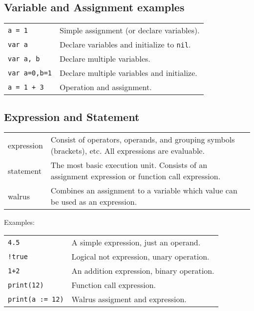 \subsection*{Variable and Assignment examples}
\begin{tabular}{@{}ll}
    \texttt{a = 1} & Simple assignment (or declare variables). \\
    \texttt{var a} & Declare variables and initialize to \texttt{nil}. \\
    \texttt{var a, b} & Declare multiple variables. \\
    \texttt{var a=0,b=1} & Declare multiple variables and initialize. \\
    \texttt{a = 1 + 3} & Operation and assignment. \\
\end{tabular}

\subsection*{Expression and Statement}
\begin{tabular}{@{}lp{}}
    \textsf{expression} & Consist of operators, operands, and grouping symbols (brackets), etc. All expressions are evaluable. \\
    \textsf{statement} & The most basic execution unit. Consists of an assignment expression or function call expression. \\
    \textsf{walrus} & Combines an assignment to a variable which value can be used as an expression.\\
\end{tabular}

\hangpar Examples:\\
\begin{tabular}{@{}ll}
    \texttt{4.5} & A simple expression, just an operand. \\
    \texttt{!true} & Logical not expression, unary operation. \\
    \texttt{1+2} & An addition expression, binary operation. \\
    \texttt{print(12)} & Function call expression. \\
    \texttt{print(a := 12)} & Walrus assigment and expression. \\
\end{tabular}

